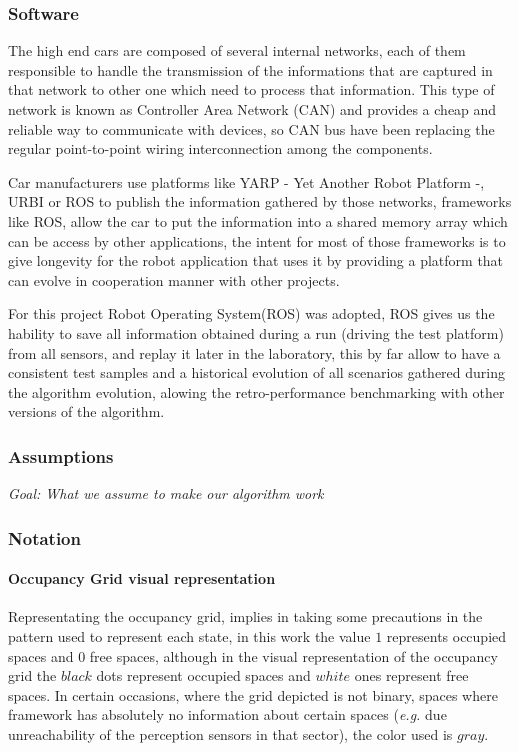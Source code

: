 \subsubsection*{Software}

The high end cars are composed of several internal networks, each of them responsible to handle the transmission of the informations that are captured in that network to other one which need to process that information. This type of network is known as Controller Area Network (CAN) and provides a cheap and reliable way to communicate with devices, so CAN bus have been replacing the regular point-to-point wiring interconnection among the components\cite{bosch91can}.

Car manufacturers use platforms like YARP - Yet Another Robot Platform -, URBI or ROS to publish the information gathered by those networks, frameworks like ROS, allow the car to put the information into a shared memory array which can be access by other applications, the intent for most of those frameworks is to give longevity\cite{Fitzpatrick:2008:TLR:1327539.1327705} for the robot application that uses it by providing a platform that can evolve in cooperation manner with other projects.

For this project Robot Operating System(ROS) was adopted, ROS gives us the hability to save all information obtained during a run (driving the test platform) from all sensors, and replay it later in the laboratory, this by far allow to have a consistent test samples and a historical evolution of all scenarios gathered during the algorithm evolution, alowing the retro-performance benchmarking with other versions of the algorithm.

\subsubsection*{Assumptions}

\textit{Goal: What we assume to make our algorithm work}

\subsubsection*{Notation}

\paragraph{Occupancy Grid visual representation}

Representating the occupancy grid, implies in taking some precautions in the pattern used to represent each state, in this work the value $1$ represents occupied spaces and $0$ free spaces, although in the visual representation of the occupancy grid the $black$ dots represent occupied spaces and $white$ ones represent free spaces. In certain occasions, where the grid depicted is not binary, spaces where framework has absolutely no information about certain spaces (\textit{e.g.} due unreachability of the perception sensors in that sector), the color used is $gray$.

